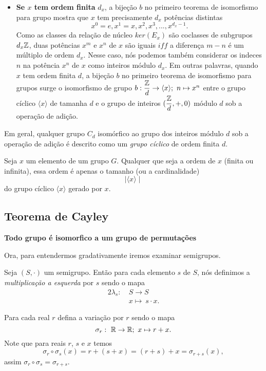\begin{definition}[Magma]
\begin{itemize}
         \item \textbf{Se $x$ tem ordem finita} $d_{x}$, a bijeção $b$ no primeiro teorema de isomorfismo para grupo mostra que $x$ tem precisamente $d_{x}$ potências distintas $$x^{0} = e, x^{1} = x, x^{2}, x^{3}, ... , x^{d_{x}-1}.$$ Como as classes da relação de núcleo $ker(E_{x})$ são coclasses de subgrupos $d_{x}\mathbb{Z}$, duas potências $x^{m}$ e $x^{n}$ de $x$ são iguais $iff$ a diferença $m - n$ é um múltiplo de ordem $d_{x}$. Nesse caso, nós podemos também considerar os indeces $n$ na potência $x^{n}$ de $x$ como inteiros módulo $d_{x}$. Em outras palavras, quando $x$ tem ordem finita $d$, a bijeção $b$ no primeiro teorema de isomorfismo para grupos surge o isomorfismo de grupo $b: \dfrac{\mathbb{Z}}{d} \to \langle x \rangle;\ n \mapsto x^{n}$ entre o grupo cíclico $\langle x \rangle$ de tamanha $d$ e o grupo de inteiros $(\dfrac{\mathbb{Z}}{d}, +, 0)$ módulo $d$ sob a operação de adição.
      \end{itemize}
      Em geral, qualquer grupo $C_{d}$ isomórfico ao grupo dos inteiros módulo $d$ sob a operação de adição é descrito como um \emph{grupo cíclico} de ordem finita $d$.
      \begin{stat}
         Seja $x$ um elemento de um grupo $G$. Qualquer que seja a ordem de $x$ (finita ou infinita), essa ordem é apenas o tamanho (ou a cardinalidade) $$\mid \langle x \rangle \mid$$ do grupo cíclico $\langle x \rangle$ gerado por $x$. 
      \end{stat}

   \subsection{Teorema de Cayley}
   \begin{center}
      \Large \color{red} \textbf{Todo grupo é isomorfico a um grupo de permutações}
   \end{center}
   Ora, para entendermos gradativamente iremos examinar semigrupos.

   Seja $(S,\cdot)$ um semigrupo. Então para cada elemento $s$ de $S$, nós definimos a \emph{multiplicação a esquerda} por $s$ sendo o mapa  
   \begin{alignat}{2}
      \lambda_{s}:\ &S \to S\nonumber\\
      &x \mapsto\ s \cdot x. \nonumber
   \end{alignat}

   \begin{exmp}
      Para cada real $r$ defina a variação por $r$ sendo o mapa $$\sigma_{r}:\ \mathbb{R} \to \mathbb{R};\ x \mapsto r + x.$$
      Note que para reais $r$, $s$ e $x$ temos $$\sigma_{r} \circ \sigma_{s} (x) = r + (s+x) = (r+s) + x = \sigma_{r+s}(x),$$ assim $\sigma_{r} \circ \sigma_{s} = \sigma_{r+s}$.


\end{exmp}
\end{definition}
